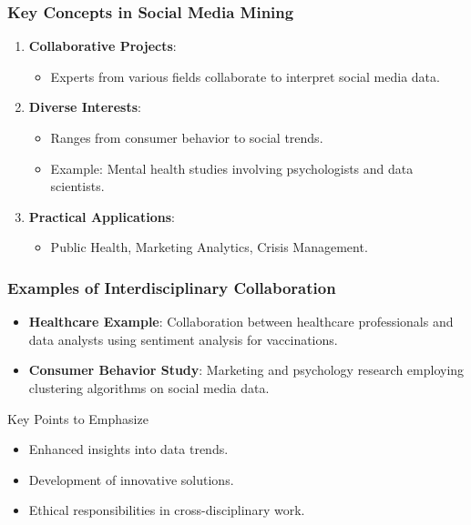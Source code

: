 \documentclass{beamer}
\begin{document}
\begin{frame}[fragile]
    \frametitle{Key Concepts in Social Media Mining}
    \begin{enumerate}
        \item \textbf{Collaborative Projects}:
            \begin{itemize}
                \item Experts from various fields collaborate to interpret social media data.
            \end{itemize}
        
        \item \textbf{Diverse Interests}:
            \begin{itemize}
                \item Ranges from consumer behavior to social trends.
                \item Example: Mental health studies involving psychologists and data scientists.
            \end{itemize}
        
        \item \textbf{Practical Applications}:
            \begin{itemize}
                \item Public Health, Marketing Analytics, Crisis Management.
            \end{itemize}
    \end{enumerate}
\end{frame}

\begin{frame}[fragile]
    \frametitle{Examples of Interdisciplinary Collaboration}
    \begin{itemize}
        \item \textbf{Healthcare Example}: Collaboration between healthcare professionals and data analysts using sentiment analysis for vaccinations.
        
        \item \textbf{Consumer Behavior Study}: Marketing and psychology research employing clustering algorithms on social media data.
    \end{itemize}

    \begin{block}{Key Points to Emphasize}
        \begin{itemize}
            \item Enhanced insights into data trends.
            \item Development of innovative solutions.
            \item Ethical responsibilities in cross-disciplinary work.
        \end{itemize}
    \end{block}
\end{frame}
\end{document}
